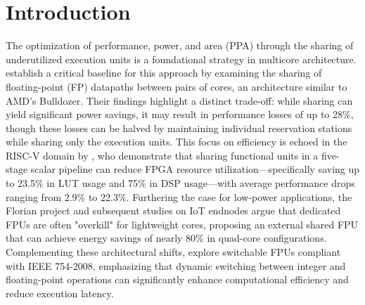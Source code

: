\documentclass[preprint]{sigplanconf}
\date{}
\title{}
\begin{document}

\begin{abstract}
This study investigates the performance and resource trade-offs of hardware sharing in the CVA6 RISC-V core, specifically targeting the Floating Point Unit (FPU). The research followed a three stage methodology: an initial microarchitectural design space exploration on a single core configuration to establish a baseline using UnixBench and NAS Parallel Benchmarks, the design of a custom arbitrator for shared FPU access, and a final evaluation of system performance. Critically, the hardware impact is assessed through resource utilization measuring FF, LUT, BRAM, and DSP. This approach quantifies the logic to performance trade-off, providing actionable insights for ASIC-targeted research within the OpenHW and PULP ecosystems.
\end{abstract}
\section{Introduction}
\label{sec:org33b8566}

The optimization of performance, power, and area (PPA) through the sharing of underutilized execution units is a foundational strategy in multicore architecture.\cite{rodrigues_does_2015} establish a critical baseline for this approach by examining the sharing of floating-point (FP) datapaths between pairs of cores, an architecture similar to AMD’s Bulldozer. Their findings highlight a distinct trade-off: while sharing can yield significant power savings, it may result in performance losses of up to 28\%, though these losses can be halved by maintaining individual reservation stations while sharing only the execution units. This focus on efficiency is echoed in the RISC-V domain by \cite{islam_efficient_2021}, who demonstrate that sharing functional units in a five-stage scalar pipeline can reduce FPGA resource utilization—specifically saving up to 23.5\% in LUT usage and 75\% in DSP usage—with average performance drops ranging from 2.9\% to 22.3\%. Furthering the case for low-power applications, the Florian project \cite{park_florian_2023} and subsequent studies on IoT endnodes \cite{park_designing_2024}  argue that dedicated FPUs are often "overkill" for lightweight cores, proposing an external shared FPU that can achieve energy savings of nearly 80\% in quad-core configurations. Complementing these architectural shifts, \cite{kumar_32-bit_2025}  explore switchable FPUs compliant with IEEE 754-2008, emphasizing that dynamic switching between integer and floating-point operations can significantly enhance computational efficiency and reduce execution latency.
\end{document}
